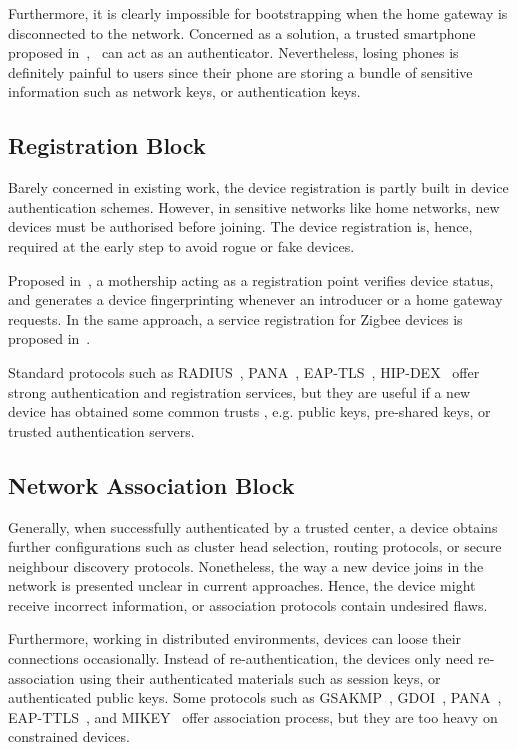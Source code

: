 Furthermore, it is clearly impossible for bootstrapping when the home gateway is disconnected to the network. Concerned as a solution, a trusted smartphone proposed in~\cite{Seung2015},~\cite{6934398} can act as an authenticator. Nevertheless, losing phones is definitely painful to users since their phone are storing a bundle of sensitive information such as network keys, or authentication keys. 

\subsection{Registration Block}
Barely concerned in existing work, the device registration is partly built in device authentication schemes. However, in sensitive networks like home networks, new devices must be authorised before joining. The device registration is, hence, required at the early step to avoid rogue or fake devices. 

Proposed in~\cite{Jeanning2013}, a mothership acting as a registration point verifies device status, and generates a device fingerprinting whenever an introducer or a home gateway requests. In the same approach, a service registration for Zigbee devices is proposed in~\cite{5174409}.

Standard protocols such as RADIUS~\cite{RADIUS}, PANA~\cite{rfc5191, Sarikaya2015}, EAP-TLS~\cite{eaptls}, HIP-DEX~\cite{hipdex} offer strong authentication and registration services, but they are useful if a new device has obtained some common trusts , e.g. public keys, pre-shared keys, or trusted authentication servers.

\subsection{Network Association Block}
Generally, when successfully authenticated by a trusted center, a device obtains further configurations such as cluster head selection, routing protocols, or secure neighbour discovery protocols. Nonetheless, the way a new device joins in the network is presented unclear in current approaches. Hence, the device might receive incorrect information, or association protocols contain undesired flaws. 

Furthermore, working in distributed environments, devices can loose their connections occasionally. Instead of re-authentication, the devices only need re-association using their authenticated materials such as session keys, or authenticated public keys. Some protocols such as GSAKMP~\cite{gsakmp}, GDOI~\cite{gdoi}, PANA~\cite{rfc5191}, EAP-TTLS~\cite{EAP-TTLSv0}, and MIKEY~\cite{MIKEY} offer association process, but they are too heavy on constrained devices. 


